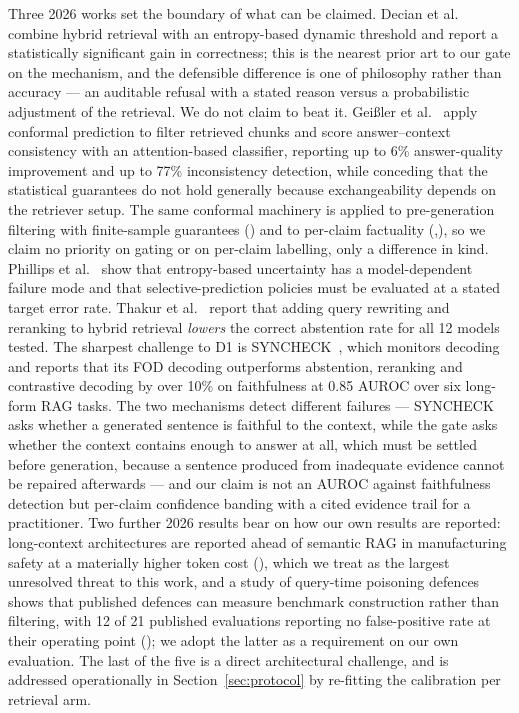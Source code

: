 \documentclass[preprint,3p,times]{elsarticle}
\begin{document}
Three 2026 works set the boundary of what can be claimed.
Decian et al.~\cite{decian2026dynamic} combine hybrid retrieval with an
entropy-based dynamic threshold and report a statistically significant gain in
correctness; this is
the nearest prior art to our gate on the mechanism, and the defensible
difference is one of philosophy rather than accuracy --- an auditable refusal
with a stated reason versus a probabilistic adjustment of the retrieval. We do
not claim to beat it.  Gei{\ss}ler et
al.~\cite{geissler2026dependable} apply conformal prediction to filter
retrieved chunks and score answer--context consistency with an attention-based
classifier, reporting up to 6\% answer-quality improvement and up to 77\%
inconsistency detection, while conceding that the statistical guarantees do
not hold generally because exchangeability depends on the retriever setup. The
same conformal machinery is applied to pre-generation filtering with
finite-sample guarantees (\cite{chen2026principled}) and to per-claim
factuality (\cite{feng2025conformal},\cite{claimconformal2026}), so we claim no
priority on gating or on per-claim labelling, only a difference in kind.
Phillips et al.~\cite{phillips2026entropy} show that entropy-based uncertainty
has a model-dependent failure mode and that selective-prediction policies must
be evaluated at a stated target error rate. Thakur et
al.~\cite{thakur2026declinecraft} report that adding query rewriting and
reranking to hybrid retrieval \emph{lowers} the correct abstention rate for all
12 models tested. The sharpest challenge to D1 is SYNCHECK~\cite{syncheck2024}, which
monitors decoding and reports that its FOD decoding outperforms abstention,
reranking and contrastive decoding by over 10\% on faithfulness at 0.85 AUROC
over six long-form RAG tasks. The two mechanisms detect different failures ---
SYNCHECK asks whether a generated sentence is faithful to the context, while
the gate asks whether the context contains enough to answer at all, which must
be settled before generation, because a sentence produced from inadequate
evidence cannot be repaired afterwards --- and our claim is not an AUROC against
faithfulness detection but per-claim confidence banding with a cited evidence
trail for a practitioner.
Two further 2026 results bear on how our own results are
reported: long-context architectures are reported ahead of semantic RAG in
manufacturing safety at a materially higher token cost
(\cite{longcontext2026tokentax}), which we treat as the largest unresolved
threat to this work, and a study of query-time poisoning defences shows that
published defences can measure benchmark construction rather than filtering,
with 12 of 21 published evaluations reporting no false-positive rate at their
operating point (\cite{ranking2026notdeciding}); we adopt the latter as a
requirement on our own evaluation. The last of the five is a direct
architectural challenge, and is addressed operationally in
Section~\ref{sec:protocol} by re-fitting the calibration per retrieval arm.
\end{document}
